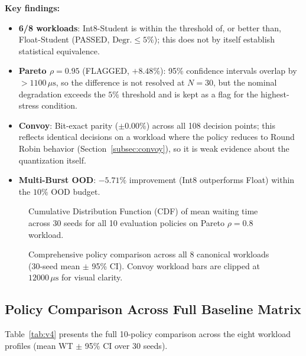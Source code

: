 \textbf{Key findings:}
\begin{itemize}
  \item \textbf{6/8 workloads}: Int8-Student is within the threshold of, or better
    than, Float-Student (PASSED, $\text{Degr.} \le 5\%$); this does not by
    itself establish statistical equivalence.
  \item \textbf{Pareto $\rho = 0.95$} (FLAGGED, $+8.48\%$): 95\% confidence
    intervals overlap by $>1100\,\mu\text{s}$, so the difference is not
    resolved at $N = 30$, but the nominal degradation exceeds the $5\%$
    threshold and is kept as a flag for the highest-stress condition.
  \item \textbf{Convoy}: Bit-exact parity ($\pm 0.00\%$) across all 108 decision
    points; this reflects identical decisions on a workload where the policy
    reduces to Round Robin behavior (Section~\ref{subsec:convoy}), so it is weak
    evidence about the quantization itself.
  \item \textbf{Multi-Burst OOD}: $-5.71\%$ improvement (Int8 outperforms Float)
    within the $10\%$ OOD budget.
\end{itemize}

\begin{figure}[t]
  \centering
  \caption{Cumulative Distribution Function (CDF) of mean waiting time across 30 seeds for all 10 evaluation policies on Pareto $\rho = 0.8$ workload.}
  \label{fig:cdf_waiting_time}
\end{figure}

\begin{figure}[t]
  \centering
  \caption{Comprehensive policy comparison across all 8 canonical workloads (30-seed mean $\pm$ 95\% CI). Convoy workload bars are clipped at $12000\,\mu\text{s}$ for visual clarity.}
  \label{fig:policy_bar_chart}
\end{figure}

\subsection{Policy Comparison Across Full Baseline Matrix}
\label{subsec:full_comparison}

Table~\ref{tab:v4} presents the full 10-policy comparison across the eight
workload profiles (mean WT $\pm$ 95\% CI over 30 seeds).


